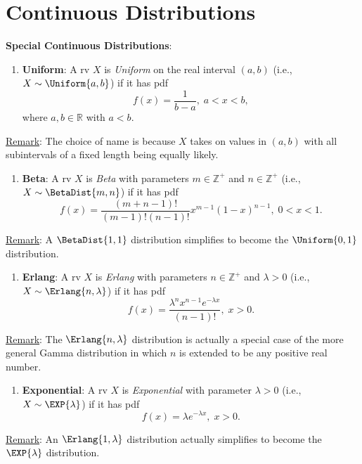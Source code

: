 \section*{Continuous Distributions}
\textbf{Special Continuous Distributions}:
\begin{Regular}
    \begin{enumerate}[1.]
        \item \textbf{Uniform}: A rv $ X $ is \emph{Uniform} on the real interval $ (a,b) $ (i.e., $ X \sim \Uniform{a,b} $) if it has pdf
              \[ f(x)=\frac{1}{b-a},\; a<x<b, \]
              where $ a,b\in\mathbb{R} $ with $ a<b $.
    \end{enumerate}
    \tcblower{}
    \underline{Remark}: The choice of name is because $ X $ takes on values in $ (a,b) $ with all subintervals of a fixed length being equally likely.
\end{Regular}
\begin{Regular}
    \begin{enumerate}[2.]
        \item \textbf{Beta}: A rv $ X $ is \emph{Beta} with parameters $ m\in\mathbb{Z}^+ $ and $ n\in\mathbb{Z}^+ $ (i.e., $ X \sim \BetaDist{m,n} $)
              if it has pdf
              \[ f(x)=\frac{(m+n-1)!}{(m-1)!(n-1)!}x^{m-1}(1-x)^{n-1},\; 0<x<1.  \]
    \end{enumerate}
    \tcblower{}
    \underline{Remark}: A $ \BetaDist{1,1} $ distribution simplifies to become the $ \Uniform{0,1} $ distribution.
\end{Regular}
\begin{Regular}
    \begin{enumerate}[3.]
        \item \textbf{Erlang}: A rv $ X $ is \emph{Erlang} with parameters $ n\in\mathbb{Z}^+ $ and $ \lambda>0 $ (i.e., $ X \sim \Erlang{n,\lambda} $)
              if it has pdf
              \[ f(x)=\frac{\lambda^n x^{n-1}e^{-\lambda x}}{(n-1)!} ,\; x>0. \]
    \end{enumerate}
    \tcblower{}
    \underline{Remark}: The $ \Erlang{n,\lambda} $ distribution is actually a special case of the more general
    Gamma distribution in which $ n $ is extended to be any positive real number.
\end{Regular}
\begin{Regular}
    \begin{enumerate}[4.]
        \item \textbf{Exponential}: A rv $ X $ is \emph{Exponential} with parameter $ \lambda>0 $ (i.e., $ X \sim \EXP{\lambda} $)
              if it has pdf
              \[ f(x)=\lambda e^{-\lambda x},\; x>0. \]
    \end{enumerate}
    \tcblower{}
    \underline{Remark}: An $ \Erlang{1,\lambda} $ distribution actually simplifies to become the $ \EXP{\lambda} $ distribution.
\end{Regular}
